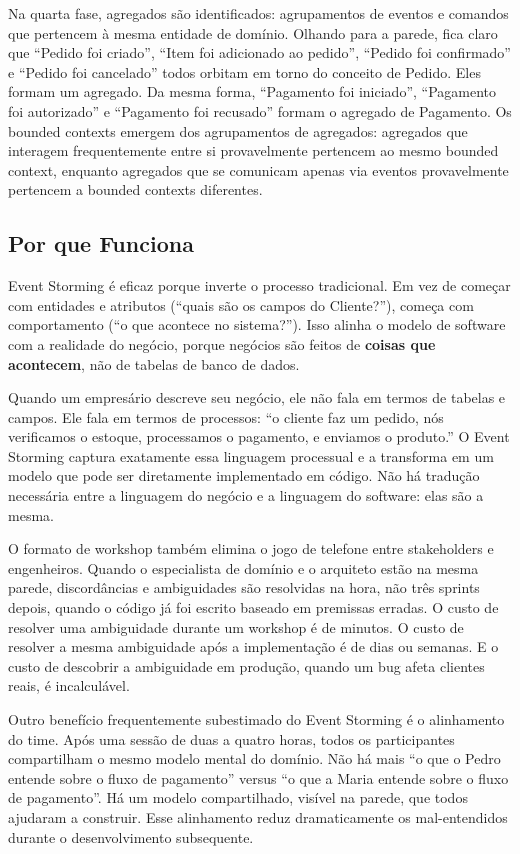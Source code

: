 Na quarta fase, agregados são identificados: agrupamentos de eventos e
comandos que pertencem à mesma entidade de domínio. Olhando para a parede,
fica claro que ``Pedido foi criado'', ``Item foi adicionado ao pedido'',
``Pedido foi confirmado'' e ``Pedido foi cancelado'' todos orbitam em torno
do conceito de Pedido. Eles formam um agregado. Da mesma forma, ``Pagamento
foi iniciado'', ``Pagamento foi autorizado'' e ``Pagamento foi recusado''
formam o agregado de Pagamento. Os bounded contexts emergem dos agrupamentos
de agregados: agregados que interagem frequentemente entre si provavelmente
pertencem ao mesmo bounded context, enquanto agregados que se comunicam
apenas via eventos provavelmente pertencem a bounded contexts diferentes.

\subsection{Por que Funciona}

Event Storming é eficaz porque inverte o processo tradicional. Em vez de começar
com entidades e atributos (``quais são os campos do Cliente?''), começa com
comportamento (``o que acontece no sistema?''). Isso alinha o modelo de software
com a realidade do negócio, porque negócios são feitos de \textbf{coisas que
acontecem}, não de tabelas de banco de dados.

Quando um empresário descreve seu negócio, ele não fala em termos de tabelas e
campos. Ele fala em termos de processos: ``o cliente faz um pedido, nós
verificamos o estoque, processamos o pagamento, e enviamos o produto.'' O Event
Storming captura exatamente essa linguagem processual e a transforma em um
modelo que pode ser diretamente implementado em código. Não há tradução
necessária entre a linguagem do negócio e a linguagem do software: elas
são a mesma.

O formato de workshop também elimina o jogo de telefone entre stakeholders
e engenheiros. Quando o especialista de domínio e o arquiteto estão na mesma
parede, discordâncias e ambiguidades são resolvidas na hora, não três sprints
depois, quando o código já foi escrito baseado em premissas erradas. O custo
de resolver uma ambiguidade durante um workshop é de minutos. O custo de
resolver a mesma ambiguidade após a implementação é de dias ou semanas. E o
custo de descobrir a ambiguidade em produção, quando um bug afeta clientes
reais, é incalculável.

Outro benefício frequentemente subestimado do Event Storming é o alinhamento
do time. Após uma sessão de duas a quatro horas, todos os participantes
compartilham o mesmo modelo mental do domínio. Não há mais ``o que o Pedro
entende sobre o fluxo de pagamento'' versus ``o que a Maria entende sobre o
fluxo de pagamento''. Há um modelo compartilhado, visível na parede, que
todos ajudaram a construir. Esse alinhamento reduz dramaticamente os
mal-entendidos durante o desenvolvimento subsequente.

